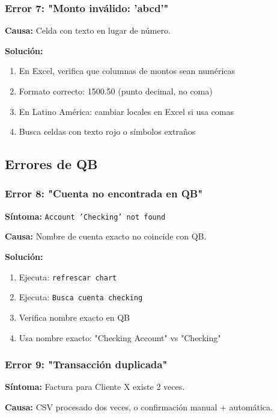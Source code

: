 \documentclass[12pt,oneside]{article}
\begin{document}
\subsubsection{Error 7: "Monto inválido: 'abcd'"}

\textbf{Causa:} Celda con texto en lugar de número.

\textbf{Solución:}
\begin{enumerate}
    \item En Excel, verifica que columnas de montos sean numéricas
    \item Formato correcto: 1500.50 (punto decimal, no coma)
    \item En Latino América: cambiar locales en Excel si usa comas
    \item Busca celdas con texto rojo o símbolos extraños
\end{enumerate}

\subsection{Errores de QB}

\subsubsection{Error 8: "Cuenta no encontrada en QB"}

\textbf{Síntoma:} \texttt{Account 'Checking' not found}

\textbf{Causa:} Nombre de cuenta exacto no coincide con QB.

\textbf{Solución:}
\begin{enumerate}
    \item Ejecuta: \texttt{refrescar chart}
    \item Ejecuta: \texttt{Busca cuenta checking}
    \item Verifica nombre exacto en QB
    \item Usa nombre exacto: "Checking Account" vs "Checking"
\end{enumerate}

\subsubsection{Error 9: "Transacción duplicada"}

\textbf{Síntoma:} Factura para Cliente X existe 2 veces.

\textbf{Causa:} CSV procesado dos veces, o confirmación manual + automática.
\end{document}
